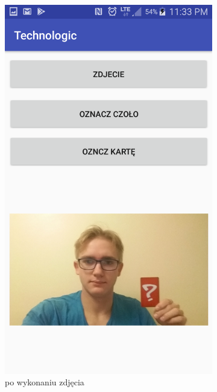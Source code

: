 \begin{figure}[H]
\begin{subfigure}{0.25\textwidth}
        \includegraphics[width=\linewidth]{imgs/czyste.png}
        \caption{po wykonaniu zdjęcia}
        \label{fig:pusteZdjecie}
    \end{subfigure}\hfill
    \begin{subfigure}{0.25\textwidth}
        \centering

\end{subfigure}
\end{figure}

